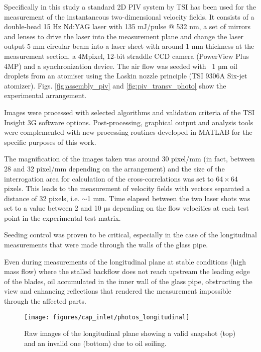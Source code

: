 Specifically in this study a standard 2D PIV system by TSI has been used for the measurement of the instantaneous two-dimensional velocity fields. It consists of a double-head 15 Hz Nd:YAG laser with 135 mJ/pulse @ 532 nm, a set of mirrors and lenses to drive the laser into the measurement plane and change the laser output 5 mm circular beam into a laser sheet with around 1 mm thickness at the measurement section, a 4Mpixel, 12-bit straddle CCD camera (PowerView Plus 4MP) and a synchronization device.
The air flow was seeded with ~1 µm oil droplets from an atomiser using the Laskin nozzle principle (TSI 9306A Six-jet atomizer). Figs. \ref{fig:assembly_piv} and \ref{fig:piv_transv_photo} show the experimental arrangement.

Images were processed with selected algorithms and validation criteria of the TSI Insight 3G software options. Post-processing, graphical output and analysis tools were complemented with new processing routines developed in MATLAB for the specific purposes of this work.

The magnification of the images taken was around 30 pixel/mm (in fact, between 28 and 32 pixel/mm depending on the arrangement) and the size of the interrogation area for calculation of the cross-correlations was set to $64\times 64$ pixels. This leads to the measurement of velocity fields with vectors separated a distance of 32 pixels, i.e. $\sim$1 mm. Time elapsed between the two laser shots was set to a value between 2 and 10 µs depending on the flow velocities at each test point in the experimental test matrix.

Seeding control was proven to be critical, especially in the case of the longitudinal measurements that were made through the walls of the glass pipe.

Even during measurements of the longitudinal plane at stable conditions (high mass flow) where the stalled backflow does not reach upstream the leading edge of the blades, oil accumulated in the inner wall of the glass pipe, obstructing the view and enhancing reflections that rendered the measurement impossible through the affected parts.

\begin{figure}[!t]
\centering
\texttt{[image: figures/cap\_inlet/photos\_longitudinal]}
\caption[Raw images of the longitudinal plane PIV measurement]{Raw images of the longitudinal plane showing a valid snapshot (top) and an invalid one (bottom) due to oil soiling.}
\label{fig:photos_longitudinal}
\end{figure}

